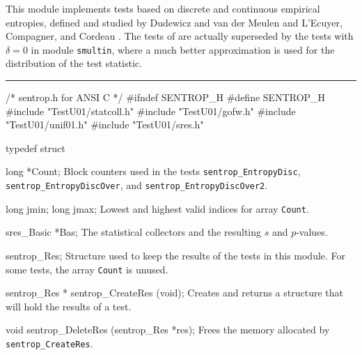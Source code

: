 
This module implements tests based on discrete and continuous 
empirical entropies, defined and studied by
Dudewicz and van der Meulen  \cite{rDUD81b,rDUD95a}
and L'Ecuyer, Compagner, and Cordeau \cite{rLEC96e}.
The tests of \cite{rDUD81b,rDUD95a} are actually superseded by the 
tests with $\delta=0$ in module {\tt smultin}, where a much better
approximation is used for the distribution of the test statistic.
 \resdef


\bigskip\hrule
\code\hide
/* sentrop.h  for ANSI C */
#ifndef SENTROP_H
#define SENTROP_H
\endhide
#include "TestU01/statcoll.h"
#include "TestU01/gofw.h"
#include "TestU01/unif01.h"
#include "TestU01/sres.h"
\endcode


\ifdetailed  %

\code

typedef struct {

   long *Count;
\endcode
\tabb
   Block counters used in the tests  {\tt sentrop\_EntropyDisc}, 
  {\tt sentrop\_EntropyDiscOver}, and {\tt sentrop\_EntropyDiscOver2}.
\endtabb
\code

   long jmin;
   long jmax;
\endcode
\tabb
  Lowest and highest valid indices for array {\tt Count}.
\endtabb
\code

   sres_Basic *Bas;
\endcode
 \tabb
  The statistical collectors and the resulting $s$ and $p$-values.
 \endtabb
\code

} sentrop_Res;
\endcode
 \tab
  Structure used to keep the results of the tests in this module.
  For some tests, the array {\tt Count} is unused.
 \endtab
\code


sentrop_Res * sentrop_CreateRes (void);
\endcode
 \tab 
  Creates and returns a structure that will hold the results of a test.
 \endtab
\code


void sentrop_DeleteRes (sentrop_Res *res);
\endcode
 \tab 
  Frees the memory allocated by {\tt sentrop\_CreateRes}.
 \endtab
\fi   %



\code

